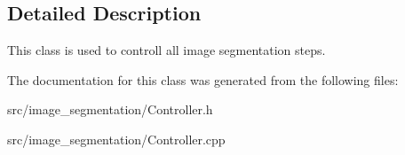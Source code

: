 \subsection{Detailed Description}
This class is used to controll all image segmentation steps. 

The documentation for this class was generated from the following files\+:\begin{DoxyCompactItemize}
\item 
src/image\+\_\+segmentation/Controller.\+h\item 
src/image\+\_\+segmentation/Controller.\+cpp\end{DoxyCompactItemize}
